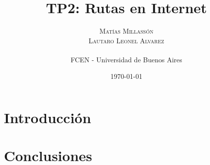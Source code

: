 \documentclass[twoside,twocolumn]{article}
\title{TP2: Rutas en Internet} %
\author{
\textsc{Matías Millassón} \\
\textsc{Lautaro Leonel Alvarez} \\
\\
\normalsize FCEN - Universidad de Buenos Aires
}
\date{\today} %
\begin{document}
\maketitle


\section{Introducci\'on}








\section{Conclusiones}

\end{document}
